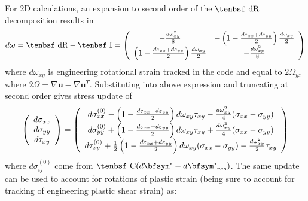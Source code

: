 \documentclass[11pt]{book}
\renewcommand{\vec}[1]{\boldsymbol{#1}}
\newcommand{\tens}[1]{\boldsymbol{\mathsf{#1}}}
\def\C{\hbox{\tenbsf C}}
\def\I{\hbox{\tenbsf I}}
\def\dR{\hbox{\tenbsf dR}}
\def\et{{\hbox{\bfsym\char'042}}}
\begin{document}
For 2D calculations, an expansion to second order of the $\dR$ decomposition results in
\begin{equation}
    d\vec\omega = \dR-\I = \left(\begin{array}{cc}
        -{d\omega_{xy}^2\over 8} & -\left(1-{d\varepsilon_{xx}+d\varepsilon_{yy}\over 2}\right){d\omega_{xy}\over2} \\
        \left(1-{d\varepsilon_{xx}+d\varepsilon_{yy}\over 2}\right){d\omega_{xy}\over2} & -{d\omega_{xy}^2\over 8} \end{array}\right)
\end{equation}
where $d\omega_{xy}$ is engineering rotational strain tracked in the code and equal to $2\Omega_{yx}$ where $2\tens\Omega = \nabla\vec u - \nabla\vec u^T$. Substituting into above expression and truncating at second order gives stress update of
\begin{equation}
   \left(\begin{array}{c} d\sigma_{xx} \\ d\sigma_{yy} \\ d\tau_{xy} \end{array}\right) = 
   \left(\begin{array}{c} d\sigma_{xx}^{(0)} - \left(1-{d\varepsilon_{xx}+d\varepsilon_{yy}\over 2}\right)d\omega_{xy}\tau_{xy}
                          - {d\omega_{xy}^2\over 4}(\sigma_{xx}-\sigma_{yy}) \\
                d\sigma_{yy}^{(0)} + \left(1-{d\varepsilon_{xx}+d\varepsilon_{yy}\over 2}\right)d\omega_{xy}\tau_{xy}
                          + {d\omega_{xy}^2\over 4}(\sigma_{xx}-\sigma_{yy}) \\
                d\tau_{xy}^{(0)} + {1\over 2}\left(1-{d\varepsilon_{xx}+d\varepsilon_{yy}\over 2}\right)d\omega_{xy}(\sigma_{xx}-\sigma_{yy})
                      - {d\omega_{xy}^2\over 2}\tau_{xy} \end{array}\right)
\end{equation} 
where $d\sigma_{ij}^{(0)}$ come from $\C(d\et - d\et_{res})$. The same update can be used to account for rotations of plastic strain (being sure to account for tracking of engineering plastic shear strain) as:
\end{document}

